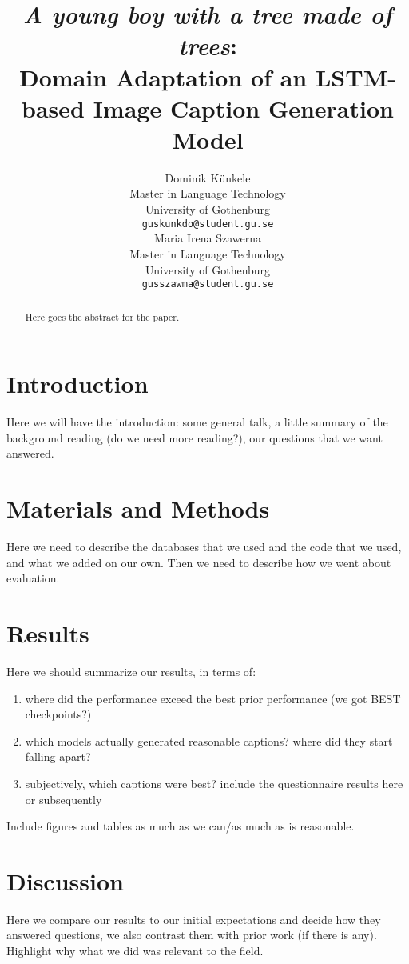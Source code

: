 \documentclass[11pt]{article}
\title{\textit{A young boy with a tree made of trees}: \\ Domain Adaptation of an LSTM-based Image Caption Generation Model}
\author{Dominik Künkele \\
  Master in Language Technology \\
  University of Gothenburg \\
  \texttt{guskunkdo@student.gu.se} \\\And
  Maria Irena Szawerna \\
  Master in Language Technology \\
  University of Gothenburg \\
  \texttt{gusszawma@student.gu.se} \\}
\begin{document}
\maketitle
\begin{abstract}
Here goes the abstract for the paper.
\end{abstract}

\section{Introduction}

Here we will have the introduction: some general talk, a little summary of the background reading (do we need more reading?), our questions that we want answered.

\section{Materials and Methods}

Here we need to describe the databases that we used and the code that we used, and what we added on our own. Then we need to describe how we went about evaluation.

\section{Results}

Here we should summarize our results, in terms of:
\begin{enumerate}
    \item where did the performance exceed the best prior performance (we got BEST checkpoints?)
    \item which models actually generated reasonable captions? where did they start falling apart?
    \item subjectively, which captions were best? include the questionnaire results here or subsequently
\end{enumerate}
Include figures and tables as much as we can/as much as is reasonable.

\section{Discussion}

Here we compare our results to our initial expectations and decide how they answered questions, we also contrast them with prior work (if there is any). Highlight why what we did was relevant to the field.
\end{document}
